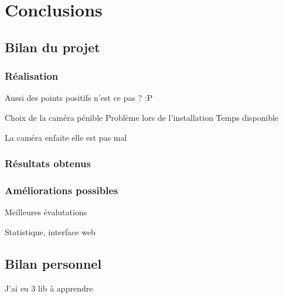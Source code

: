 \chapter{Conclusions}
\section{Bilan du projet}
\subsection{Réalisation}



Aussi des points positifs n'est ce pas ? :P

Choix de la caméra pénible
Problème lors de l'installation
Temps disponible

La caméra enfaite elle est pas mal




\subsection{Résultats obtenus}
\subsection{Améliorations possibles}

Meilleures évalutations

Statistique, interface web
\section{Bilan personnel}


J'ai eu 3 lib à apprendre
